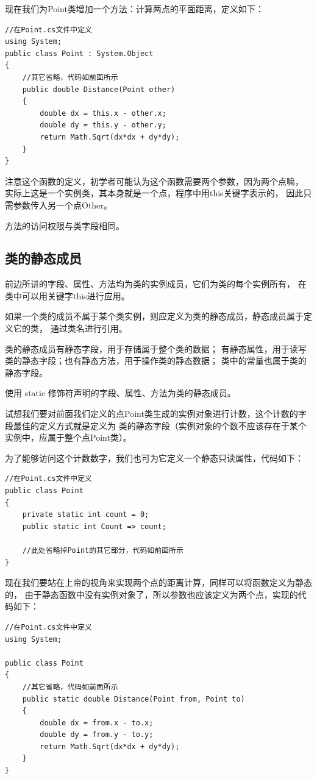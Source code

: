 现在我们为Point类增加一个方法：计算两点的平面距离，定义如下：

\begin{lstlisting}
//在Point.cs文件中定义
using System;
public class Point : System.Object
{ 
    //其它省略，代码如前面所示
    public double Distance(Point other)
    {
        double dx = this.x - other.x;
        double dy = this.y - other.y;
        return Math.Sqrt(dx*dx + dy*dy);
    }    
}
\end{lstlisting}

注意这个函数的定义，初学者可能认为这个函数需要两个参数，因为两个点嘛，
实际上这是一个实例类，其本身就是一个点，程序中用this关键字表示的，
因此只需参数传入另一个点Other。

方法的访问权限与类字段相同。



\subsection{类的静态成员}

前边所讲的字段、属性、方法均为类的实例成员，它们为类的每个实例所有，
在类中可以用关键字this进行应用。

如果一个类的成员不属于某个类实例，则应定义为类的静态成员，静态成员属于定义它的类，
通过类名进行引用。

类的静态成员有静态字段，用于存储属于整个类的数据；
有静态属性，用于读写类的静态字段；也有静态方法，用于操作类的静态数据；
类中的常量也属于类的静态字段。

使用 static 修饰符声明的字段、属性、方法为类的静态成员。

试想我们要对前面我们定义的点Point类生成的实例对象进行计数，这个计数的字段最佳的定义方式就是定义为
类的静态字段（实例对象的个数不应该存在于某个实例中，应属于整个点Point类）。

为了能够访问这个计数数字，我们也可为它定义一个静态只读属性，代码如下：

\begin{lstlisting}
//在Point.cs文件中定义
public class Point
{
    private static int count = 0;
    public static int Count => count;

    //此处省略掉Point的其它部分，代码如前面所示    
}
\end{lstlisting}

现在我们要站在上帝的视角来实现两个点的距离计算，同样可以将函数定义为静态的，
由于静态函数中没有实例对象了，所以参数也应该定义为两个点，实现的代码如下：

\begin{lstlisting}
//在Point.cs文件中定义
using System;

public class Point
{ 
    //其它省略，代码如前面所示
    public static double Distance(Point from, Point to)
    {
        double dx = from.x - to.x;
        double dy = from.y - to.y;
        return Math.Sqrt(dx*dx + dy*dy);
    }    
}
\end{lstlisting}

